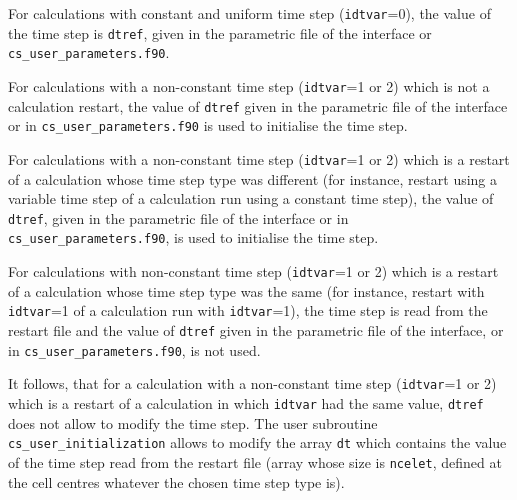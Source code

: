 {{{
\begin{list}{-}{}
\item For calculations with constant and uniform time step
      (\texttt{idtvar}=0), the value of the time step is \texttt{dtref},
      given in the parametric file of the interface or \texttt{cs\_user\_parameters.f90}.
\item For calculations with a non-constant time step
      (\texttt{idtvar}=1 or 2) which is not a calculation restart,
      the value of \texttt{dtref} given in the parametric file of the interface
      or in \texttt{cs\_user\_parameters.f90} is used to initialise the time step.
\item For calculations with a non-constant time step
      (\texttt{idtvar}=1 or 2) which is a restart of a
      calculation whose time step type was different (for instance, restart
      using a variable time step of a calculation run using a constant time
      step), the value of \texttt{dtref}, given in the parametric file of the
      interface or in \texttt{cs\_user\_parameters.f90}, is used to initialise the time step.
\item For calculations with non-constant time step
      (\texttt{idtvar}=1 or 2) which is a restart of a
      calculation whose time step type was the same (for instance, restart with
      \texttt{idtvar}=1 of a calculation run with \texttt{idtvar}=1), the time
      step is read from the restart file and the value of \texttt{dtref} given
      in the parametric file of the interface, or in \texttt{cs\_user\_parameters.f90}, is not used.
\end{list}
It follows, that for a calculation with a non-constant time step (\texttt{idtvar}=1
or 2) which is a restart of a calculation in which
\texttt{idtvar} had the same value, \texttt{dtref} does not allow to modify the
time step. The user subroutine \texttt{cs\_user\_initialization} allows to modify the array
\texttt{dt} which contains the value of the time step read from the restart file
(array whose size is \texttt{ncelet}, defined at the cell centres whatever the
chosen time step type is).

}}}
